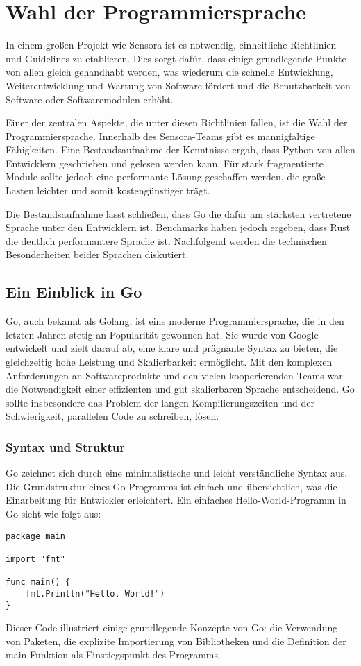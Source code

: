 
\section{Wahl der Programmiersprache}
In einem großen Projekt wie Sensora ist es notwendig, einheitliche Richtlinien und Guidelines zu etablieren. Dies sorgt dafür, dass einige grundlegende Punkte von allen gleich gehandhabt werden, was wiederum die schnelle Entwicklung, Weiterentwicklung und Wartung von Software fördert und die Benutzbarkeit von Software oder Softwaremodulen erhöht.

Einer der zentralen Aspekte, die unter diesen Richtlinien fallen, ist die Wahl der Programmiersprache. Innerhalb des Sensora-Teams gibt es mannigfaltige Fähigkeiten. Eine Bestandsaufnahme der Kenntnisse ergab, dass Python von allen Entwicklern geschrieben und gelesen werden kann.
Für stark fragmentierte Module sollte jedoch eine performante Lösung geschaffen werden, die große Lasten leichter und somit kostengünstiger trägt.

Die Bestandsaufnahme lässt schließen, dass Go die dafür am stärksten vertretene Sprache unter den Entwicklern ist. Benchmarks haben jedoch ergeben, dass Rust die deutlich performantere Sprache ist. \cite{Prokopiou2021} Nachfolgend werden die technischen Besonderheiten beider Sprachen diskutiert.

\subsection{Ein Einblick in Go}
Go, auch bekannt als Golang, ist eine moderne Programmiersprache, die in den letzten Jahren stetig an Popularität gewonnen hat. \cite{JetBrains2023} Sie wurde von Google entwickelt und zielt darauf ab, eine klare und prägnante Syntax zu bieten, die gleichzeitig hohe Leistung und Skalierbarkeit ermöglicht. Mit den komplexen Anforderungen an Softwareprodukte und den vielen kooperierenden Teams war die Notwendigkeit einer effizienten und gut skalierbaren Sprache entscheidend. Go sollte insbesondere das Problem der langen Kompilierungszeiten und der Schwierigkeit, parallelen Code zu schreiben, lösen.

\subsubsection{Syntax und Struktur}
Go zeichnet sich durch eine minimalistische und leicht verständliche Syntax aus. Die Grundstruktur eines Go-Programms ist einfach und übersichtlich, was die Einarbeitung für Entwickler erleichtert. Ein einfaches Hello-World-Programm in Go sieht wie folgt aus:
\begin{lstlisting}[language=Golang]
package main

import "fmt"

func main() {
    fmt.Println("Hello, World!")
}
\end{lstlisting}
Dieser Code illustriert einige grundlegende Konzepte von Go: die Verwendung von Paketen, die explizite Importierung von Bibliotheken und die Definition der main-Funktion als Einstiegspunkt des Programms.

